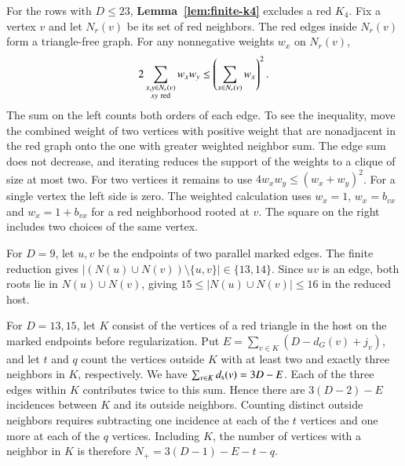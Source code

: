 \documentclass[preprint,11pt,numbers]{elsarticle-arxiv}
\numberwithin{equation}{section}
\theoremstyle{definition}
\begin{document}
For the rows with $D\leq23$, \textbf{Lemma~\ref{lem:finite-k4}}
excludes a red $K_4$. Fix a vertex $v$ and let $N_r(v)$ be its set of red
neighbors. The red edges inside $N_r(v)$ form a triangle-free
graph. For any nonnegative weights $w_x$ on $N_r(v)$,
\[
 2\sum_{\substack{x,y\in N_r(v)\\xy\ {\rm red}}}w_xw_y
 \le \left(\sum_{x\in N_r(v)} w_x\right)^2.
\]
The sum on the left counts both orders of each edge. To see the
inequality, move the combined weight of two vertices with positive
weight that are nonadjacent in the red graph
onto the one with greater weighted neighbor sum. The edge sum does
not decrease, and iterating reduces the support of the weights to
a clique of size at most two. For two vertices it remains to use
$4w_xw_y\le(w_x+w_y)^2$. For a single vertex the left side is zero.
The weighted calculation uses
$w_x=1$, $w_x=b_{vx}$ and $w_x=1+b_{vx}$ for a red neighborhood rooted at $v$.
The square on the right includes two choices of the same vertex.


For $D=9$, let $u,v$ be the endpoints of two parallel marked
edges. The finite reduction gives
$|(N(u)\cup N(v))\setminus\{u,v\}|\in\{13,14\}$.
Since $uv$ is an edge, both roots lie in $N(u)\cup N(v)$, giving
$15\leq|N(u)\cup N(v)|\leq16$ in the reduced host.

For $D=13,15$, let $K$ consist of the vertices of a red triangle in
the host on the marked endpoints before regularization. Put
$E=\sum_{v\in K}(D-d_G(v)+j_v)$, and let $t$ and $q$ count the
vertices outside $K$ with at least two and exactly three neighbors
in $K$, respectively. We have $\sum_{v\in K}d_{\rm s}(v)=3D-E$.
Each of the three edges within $K$ contributes twice to this sum.
Hence there are $3(D-2)-E$ incidences between $K$ and its outside
neighbors. Counting distinct outside neighbors requires subtracting
one incidence at each of the $t$ vertices and one more at each of
the $q$ vertices. Including $K$, the number of vertices with a
neighbor in $K$ is therefore $N_+=3(D-1)-E-t-q$.
\end{document}
